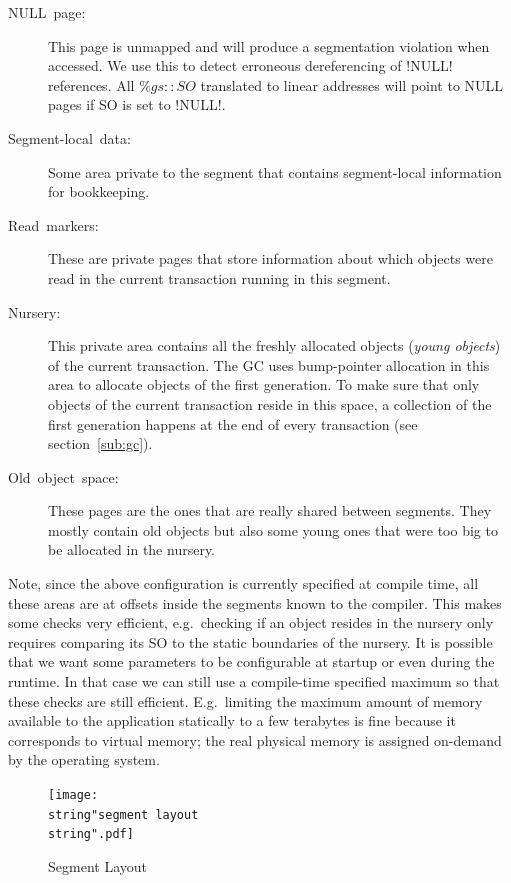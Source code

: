 \documentclass{sigplanconf}
\makeatletter
\renewcommand\lstinline[1][]{%
  \Collectverb{\@@myverb}%
}
\def\@@myverb#1{%
    \begingroup
    \fboxsep=0.2em
    \colorbox{verylightgray}{\oldlstinline|#1|}%
    \endgroup
}
\makeatother
\begin{document}
\begin{description}
\item [{NULL~page:}] This page is unmapped and will produce a
  segmentation violation when accessed. We use this to detect
  erroneous dereferencing of \lstinline!NULL! references.  All
  $\%gs{::}SO$ translated to linear addresses will point to NULL pages
  if SO is set to \lstinline!NULL!.
\item [{Segment-local~data:}] Some area private to the segment that
  contains segment-local information for bookkeeping.
\item [{Read~markers:}] These are private pages that store information about
  which objects were read in the current transaction running in this
  segment.
\item [{Nursery:}] This private area contains all the freshly allocated
  objects (\emph{young objects}) of the current transaction. The GC
  uses bump-pointer allocation in this area to allocate objects of the
  first generation. To make sure that only objects of the current
  transaction reside in this space, a collection of the first
  generation happens at the end of every transaction (see
  section~\ref{sub:gc}).
\item [{Old~object~space:}] These pages are the ones that are really
  shared between segments. They mostly contain old objects but also
  some young ones that were too big to be allocated in the nursery.
\end{description}

Note, since the above configuration is currently specified at compile time,
all these areas are at offsets inside the segments known to the
compiler. This makes some checks very efficient, e.g.\ checking
if an object resides in the nursery only requires comparing its SO
to the static boundaries of the nursery. It is possible that we want
some parameters to be configurable at startup or even during the
runtime. In that case we can still use a compile-time specified
maximum so that these checks are still efficient. E.g.\ limiting the
maximum amount of memory available to the application statically to a few
terabytes is fine because it corresponds to virtual memory;
the real physical memory is assigned on-demand by the operating
system.




\begin{figure}[t]
  \centering
  \texttt{[image: \\string"segment layout\\string".pdf]}
  \caption{Segment Layout\label{fig:Segment-Layout}}
\end{figure}
\end{document}
